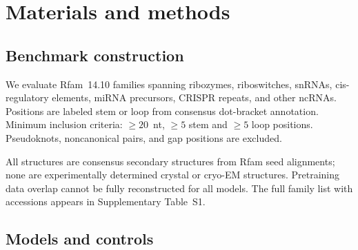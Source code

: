 \documentclass[11pt]{article}
\begin{document}
\section{Materials and methods}
\label{sec:methods}

\subsection{Benchmark construction}
\label{sec:benchmark}

We evaluate \panelN{} Rfam~14.10 families \citep{kalvari2021rfam} spanning ribozymes, riboswitches, snRNAs,
cis-regulatory elements, miRNA precursors, CRISPR repeats, and other ncRNAs.
Positions are labeled stem or loop from consensus dot-bracket annotation.
Minimum inclusion criteria: $\geq 20$~nt, $\geq 5$ stem and $\geq 5$ loop
positions. Pseudoknots, noncanonical pairs, and gap positions are excluded.

All structures are consensus secondary structures from Rfam seed alignments;
none are experimentally determined crystal or cryo-EM structures. Pretraining
data overlap cannot be fully reconstructed for all models. The full family
list with accessions appears in Supplementary Table~S1.

\subsection{Models and controls}
\label{sec:models}
\end{document}
